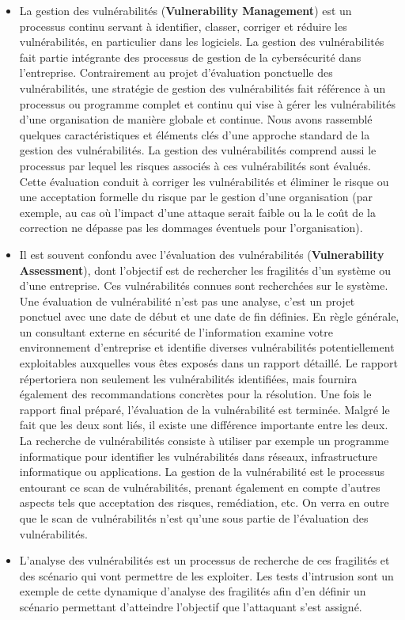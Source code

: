 \begin{itemize}
\item La gestion des vulnérabilités (\textbf{Vulnerability Management}) est un processus continu servant à identifier, classer, corriger et réduire les vulnérabilités, en particulier dans les logiciels. La gestion des vulnérabilités fait partie intégrante des processus de gestion de la cybersécurité dans l’entreprise. Contrairement au projet d’évaluation ponctuelle des vulnérabilités, une stratégie de gestion des vulnérabilités fait référence à un processus ou programme complet et continu qui vise à gérer les vulnérabilités d’une organisation de manière globale et continue. Nous avons rassemblé quelques caractéristiques et éléments clés d’une approche standard de la gestion des vulnérabilités.
La gestion des vulnérabilités comprend aussi le processus par lequel  les risques associés à ces vulnérabilités sont évalués. Cette évaluation conduit à corriger les vulnérabilités et éliminer le risque ou une acceptation formelle du risque par le gestion d’une organisation (par exemple, au cas où l’impact d’une attaque serait faible ou la le coût de la correction ne dépasse pas les dommages éventuels pour l’organisation).
\item Il est souvent confondu avec l’évaluation des vulnérabilités (\textbf{Vulnerability Assessment}), dont l’objectif est de rechercher les fragilités d’un système ou d’une entreprise. Ces vulnérabilités connues sont recherchées sur le système. Une évaluation de vulnérabilité n'est pas une analyse, c'est un projet ponctuel avec une date de début et une date de fin définies. En règle générale, un consultant externe en sécurité de l'information examine votre environnement d'entreprise et identifie diverses vulnérabilités potentiellement exploitables auxquelles vous êtes exposés dans un rapport détaillé. Le rapport répertoriera non seulement les vulnérabilités identifiées, mais fournira également des recommandations concrètes pour la résolution. Une fois le rapport final préparé, l'évaluation de la vulnérabilité est terminée.
Malgré le fait que les deux sont liés, il existe une différence importante entre les deux. La recherche de vulnérabilités consiste à utiliser par exemple un programme informatique pour identifier les vulnérabilités dans réseaux, infrastructure informatique ou applications. La gestion de la vulnérabilité est le processus entourant ce scan de vulnérabilités, prenant également en compte d’autres aspects tels que acceptation des risques, remédiation, etc. On verra en outre que le scan de vulnérabilités n’est qu’une sous partie de l’évaluation des vulnérabilités.
\item L’analyse des vulnérabilités est un processus de recherche de ces fragilités et des scénario qui vont permettre de les exploiter. Les tests d’intrusion sont un exemple de cette dynamique d’analyse des fragilités afin d’en définir un scénario permettant d’atteindre l’objectif que l’attaquant s’est assigné.
\end{itemize}


